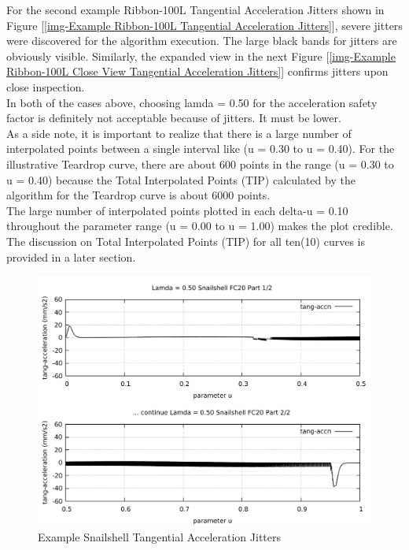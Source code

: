 For the second example Ribbon-100L Tangential Acceleration Jitters shown in Figure [\ref{img-Example Ribbon-100L Tangential Acceleration Jitters}], severe jitters were discovered for the algorithm execution. The large black bands for jitters are obviously visible. Similarly, the expanded view in the next Figure [\ref{img-Example Ribbon-100L Close View Tangential Acceleration Jitters}] confirms jitters upon close inspection. \\
 
In both of the cases above, choosing lamda = 0.50 for the acceleration safety factor is definitely not acceptable because of jitters. It must be lower.\\

As a side note, it is important to realize that there is a large number of interpolated points between a single interval like (u = 0.30 to u = 0.40). For the illustrative Teardrop curve, there are about 600 points in the range (u = 0.30 to u = 0.40) because the Total Interpolated Points (TIP) calculated by the algorithm for the Teardrop curve is about 6000 points. \\

The large number of interpolated points plotted in each delta-u = 0.10 throughout the parameter range (u = 0.00 to u = 1.00) makes the plot credible. The discussion on Total Interpolated Points (TIP) for all ten(10) curves is provided in a later section. \\


\clearpage
\pagebreak
\begin{landscape}
	\begin{figure}
		\centering
		\caption  {Example Snailshell Tangential Acceleration Jitters}
		\label{img-Example Snailshell Tangential Acceleration Jitters}
		\includegraphics[width=1.30\textwidth]{Chap4/Lamda/jitters/Example-Snailshell-Jitters-Lamda-050-FC20-Part-1-of-2.pdf} 
	\end{figure}
\end{landscape}

